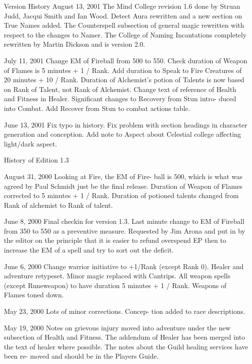\begin{Chapter}{Version History}
August  13,  2001  The  Mind  College  revision  1.6 
done by Struan Judd, Jacqui Smith and  Ian Wood. 
Detect  Aura  rewritten  and  a  new  section  on  True 
Names  added.  The  Counterspell  subsection  of 
general magic rewritten with respect to the changes 
to  Namer.  The  College  of  Naming  Incantations 
completely  rewritten  by  Martin  Dickson  and  is 
version 2.0. 

July 11, 2001 Change EM of  Fireball from 500 to 
550.  Check  duration  of  Weapon  of  Flames  is  5 
minutes + 1 / Rank. Add duration to Speak to Fire 
Creatures  of  20  minutes  +  10  /  Rank.  Duration  of 
Alchemist’s  potion  of  Talents  is  now  based  on 
Rank  of  Talent,  not  Rank  of  Alchemist.  Change 
text  of  reference  of  Health  and  Fitness  in  Healer. 
Significant  changes  to  Recovery  from  Stun  intro-
duced  into  Combat.  Add  Recover  from  Stun  to 
combat actions table. 

June  13,  2001  Fix  typo  in  history.  Fix  problem 
with  section  headings  in  character  generation  and 
conception.  Add  note  to  Aspect  about  Celestial 
college affecting light/dark aspect. 

History of Edition 1.3 

August  31,  2000  Looking  at  Fire,  the  EM  of  Fire-
ball  is  500,  which  is  what  was  agreed  by  Paul 
Schmidt  just  be  the  final  release.  Duration  of 
Weapon  of  Flames  corrected  to  5  minutes  +  1  / 
Rank.  Duration  of  potioned  talents  changed  from 
Rank of alchemist to Rank of talent. 

June  8,  2000  Final  checkin  for  version  1.3.  Last 
minute  change  to  EM  of  Fireball  from 350  to 550 
as  a  preventive  measure.  Requested  by  Jim  Arona 
and  put  in  by  the  editor  on  the  principle  that  it  is 
easier to refund overspend EP then to increase the 
EM of a spell and try to sort out the deficit. 

June 6, 2000 Change warrior initiative to +1/Rank 
(except  Rank  0).  Healer  and  adventure  retypeset. 
Minor  magic  replaced  with  Cantrips.  All  weapon 
spells  (except  Runeweapon)  to  have  duration  5 
minutes  +  1  /  Rank.  Weapons  of  Flames  toned 
down. 

May  23,  2000  Lots  of  minor  corrections.  Concep-
tion added to race descriptions. 

May 19, 2000 Notes on grievous injury moved into 
adventure  under  the  new  subsection of  Health  and 
Fitness. The addendum of Healer has been merged 
into  the  text  of  healer  where  possible.  The  notes 
about  the  Guild  healing  services  have  been  re-
moved and should be in the Players Guide. 


\end{Chapter}
